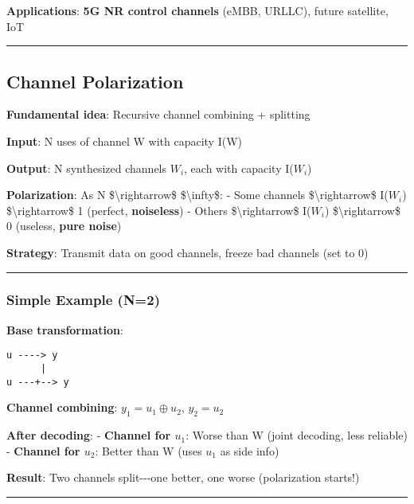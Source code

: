 \textbf{Applications}: \textbf{5G NR control channels} (eMBB, URLLC),
future satellite, IoT

\begin{center}\rule{0.5\linewidth}{0.5pt}\end{center}

\subsection{Channel Polarization}\label{channel-polarization}

\textbf{Fundamental idea}: Recursive channel combining + splitting

\textbf{Input}: N uses of channel W with capacity I(W)

\textbf{Output}: N synthesized channels \(W_i\), each with capacity
I(\(W_i\))

\textbf{Polarization}: As N \$\textbackslash rightarrow\$
\$\textbackslash infty\$: - Some channels \$\textbackslash rightarrow\$
I(\(W_i\)) \$\textbackslash rightarrow\$ 1 (perfect, \textbf{noiseless})
- Others \$\textbackslash rightarrow\$ I(\(W_i\))
\$\textbackslash rightarrow\$ 0 (useless, \textbf{pure noise})

\textbf{Strategy}: Transmit data on good channels, freeze bad channels
(set to 0)

\begin{center}\rule{0.5\linewidth}{0.5pt}\end{center}

\subsubsection{Simple Example (N=2)}\label{simple-example-n2}

\textbf{Base transformation}:

\begin{verbatim}
u ----> y
      |
u ---+--> y
\end{verbatim}

\textbf{Channel combining}: \(y_1 = u_1 \oplus u_2\), \(y_2 = u_2\)

\textbf{After decoding}: - \textbf{Channel for \(u_1\)}: Worse than W
(joint decoding, less reliable) - \textbf{Channel for \(u_2\)}: Better
than W (uses \(u_1\) as side info)

\textbf{Result}: Two channels split-\/-\/-one better, one worse
(polarization starts!)

\begin{center}\rule{0.5\linewidth}{0.5pt}\end{center}

